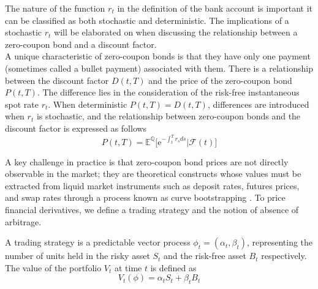     \noindent
    The nature of the function $r_t$ in the definition of the bank account is important it can be classified as both stochastic and deterministic. The implications of a stochastic $r_t$ will be elaborated on when discussing the relationship between a zero-coupon bond and a discount factor. \\

    \noindent
    A unique characteristic of zero-coupon bonds is that they have only one payment (sometimes called a bullet payment) associated with them. There is a relationship between the discount factor $D(t,T)$ and the price of the zero-coupon bond $P(t,T)$. The difference lies in the consideration of the risk-free instantaneous spot rate $r_t$. When deterministic $P(t,T) = D(t,T)$, differences are introduced when $r_t$ is stochastic, and the relationship between zero-coupon bonds and the discount factor is expressed as follows  \\
    
    \begin{equation}
        P(t,T) = \mathbb{E}^\mathbb{Q} \big[ \text{e}^{- \int_{t}^{T} r_s ds}\big | \mathscr{F}(t)]
    \end{equation}

    \noindent
    A key challenge in practice is that zero-coupon bond prices are not directly observable in the market; they are theoretical constructs whose values must be extracted from liquid market instruments such as deposit rates, futures prices, and swap rates through a process known as curve bootstrapping \cite{brigo2001interest}. To price financial derivatives, we define a trading strategy and the notion of absence of arbitrage.


    \begin{definition}\label{def:trading-strategy}
     A trading strategy is a predictable vector process $\phi_t = (\alpha_t,\beta_t)$, representing the number of units held in the risky asset $S_t$ and the risk-free asset $B_t$ respectively. The value of the portfolio $V_t$ at time $t$ is defined as
    \begin{equation}
        V_t(\phi) = \alpha_tS_t + \beta_tB_t
    \end{equation}
        
    \end{definition}


